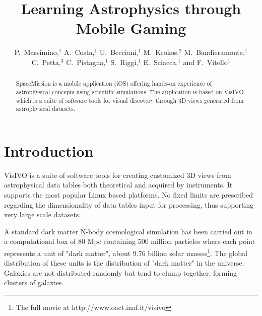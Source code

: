 
\resetcounters





\title{Learning Astrophysics through Mobile Gaming}
\author{P.~Massimino,$^1$ A.~Costa,$^1$ U.~Becciani,$^1$ M.~Krokos,$^2$ M.~Bandieramonte,$^1$ C.~Petta,$^3$ C.~Pistagna,$^1$ S.~Riggi,$^1$ E.~Sciacca,$^1$ and F.~Vitello$^1$
}


\begin{abstract}
SpaceMission is a mobile application (iOS) offering hands-on experience of astrophysical concepts using scientific simulations. The application is based on VisIVO which is a suite of software tools for visual discovery through 3D views generated from astrophysical datasets.
\end{abstract}

\section{Introduction}
VisIVO  is a suite of software tools for creating customized 3D views from astrophysical data tables both theoretical and acquired by instruments. It supports the most popular Linux based platforms. No fixed limits are prescribed regarding the dimensionality of data tables input for processing, thus supporting very large scale datasets.

A standard dark matter N-body cosmological simulation has been carried out in a computational box of 80 Mpc containing 500 million particles where each point represents a unit  of "dark matter", about 9.76 billion solar masses\footnote{The full movie at http://www.oact.inaf.it/visivo}. The global distribution of these units is the distribution of "dark matter" in the universe. Galaxies are not distributed randomly but tend to clump together, forming clusters of galaxies.

